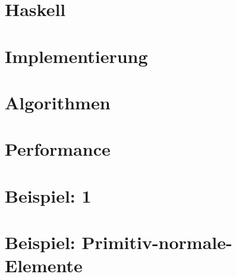 \documentclass[ngerman
  ,fontsize=11pt %
  ,numbers=noenddot %
  ,parskip=half*
  ,openany
  ,DIV=10
  ,fleqn %
  ,oneside
]{./myClass}
\begin{document}
\ifnum{}
  \frontmatter
  
  \newpage \thispagestyle{empty} \mbox{}
\else
  \mainmatter
\fi

\tableofcontents{}


\ifnum{}
  \mainmatter
\fi

%

\chapter{Haskell}


\chapter{Implementierung}







\chapter{Algorithmen}


\chapter{Performance}

\chapter{Beispiel: 1}

\chapter{Beispiel: Primitiv-normale-Elemente}



%

\pagebreak
\printbibliography

\appendix
{}



\end{document}
